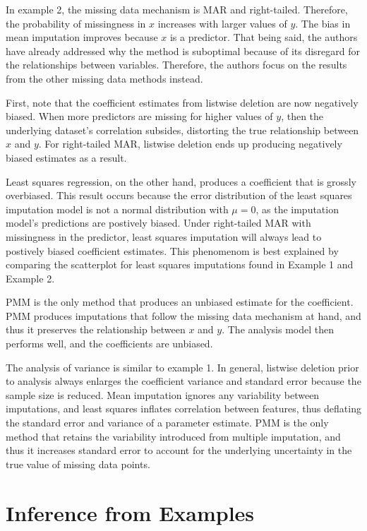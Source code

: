 \documentclass[12pt,oneside]{chicagocapstone}
\begin{document}
In example 2, the missing data mechanism is MAR and right-tailed.
Therefore, the probability of missingness in \(x\) increases with larger
values of \(y\). The bias in mean imputation improves because \(x\) is a
predictor. That being said, the authors have already addressed why the
method is suboptimal because of its disregard for the relationships
between variables. Therefore, the authors focus on the results from the
other missing data methods instead.

First, note that the coefficient estimates from listwise deletion are
now negatively biased. When more predictors are missing for higher
values of \(y\), then the underlying dataset's correlation subsides,
distorting the true relationship between \(x\) and \(y\). For
right-tailed MAR, listwise deletion ends up producing negatively biased
estimates as a result.

Least squares regression, on the other hand, produces a coefficient that
is grossly overbiased. This result occurs because the error distribution
of the least squares imputation model is not a normal distribution with
\(\mu=0\), as the imputation model's predictions are postively biased.
Under right-tailed MAR with missingness in the predictor, least squares
imputation will always lead to postively biased coefficient estimates.
This phenomenom is best explained by comparing the scatterplot for least
squares imputations found in Example 1 and Example 2.

PMM is the only method that produces an unbiased estimate for the
coefficient. PMM produces imputations that follow the missing data
mechanism at hand, and thus it preserves the relationship between \(x\)
and \(y\). The analysis model then performs well, and the coefficients
are unbiased.

The analysis of variance is similar to example 1. In general, listwise
deletion prior to analysis always enlarges the coefficient variance and
standard error because the sample size is reduced. Mean imputation
ignores any variability between imputations, and least squares inflates
correlation between features, thus deflating the standard error and
variance of a parameter estimate. PMM is the only method that retains
the variability introduced from multiple imputation, and thus it
increases standard error to account for the underlying uncertainty in
the true value of missing data points.

\section*{Inference from Examples}\label{inference-from-examples}
\end{document}
